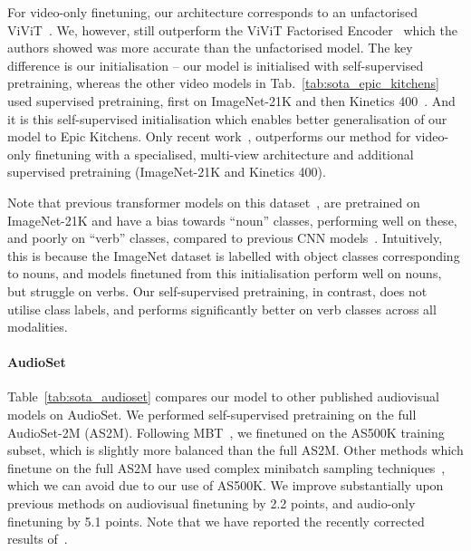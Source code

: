 \documentclass[10pt,twocolumn,letterpaper]{article}
\def \paravspace {-1\baselineskip}
\begin{document}
For video-only finetuning, our architecture corresponds to an unfactorised ViViT~\cite{arnab2021vivit}. We, however, still outperform the ViViT Factorised Encoder~\cite{arnab2021vivit} which the authors showed was more accurate than the unfactorised model.
The key difference is our initialisation -- our model is initialised with self-supervised pretraining, whereas the other video models in Tab.~\ref{tab:sota_epic_kitchens} used supervised pretraining, first on ImageNet-21K and then Kinetics 400~\cite{arnab2021vivit,yan2022multiview,patrick2021keeping}.
And it is this self-supervised initialisation which enables better generalisation of our model to Epic Kitchens.
Only recent work~\cite{yan2022multiview}, outperforms our method for video-only finetuning with a specialised, multi-view architecture and additional supervised pretraining (ImageNet-21K and Kinetics 400).

Note that previous transformer models on this dataset~\cite{arnab2021vivit,yan2022multiview,patrick2021keeping,nagrani2021attention}, are pretrained on ImageNet-21K and have a bias towards ``noun'' classes, performing well on these, and poorly on ``verb'' classes, compared to previous CNN models~\cite{lin2019tsm}.
Intuitively, this is because the ImageNet dataset is labelled with object classes corresponding to nouns, and models finetuned from this initialisation perform well on nouns, but struggle on verbs.
Our self-supervised pretraining, in contrast, does not utilise class labels, and performs significantly better on verb classes across all modalities.



\vspace{\paravspace}
\paragraph{AudioSet}

Table~\ref{tab:sota_audioset} compares our model to other published audiovisual models on AudioSet.
We performed self-supervised pretraining on the full AudioSet-2M (AS2M).
Following MBT~\cite{nagrani2021attention}, we finetuned on the AS500K training subset, which is slightly more balanced than the full AS2M.
Other methods which finetune on the full AS2M have used complex minibatch sampling techniques~\cite{wang2020makes}, which we can avoid due to our use of AS500K.
We improve substantially upon previous methods on audiovisual finetuning by 2.2 points, and audio-only finetuning by 5.1 points.
Note that we have reported the recently corrected results of~\cite{nagrani2021attention}.
 \vspace{-1mm}
\end{document}
